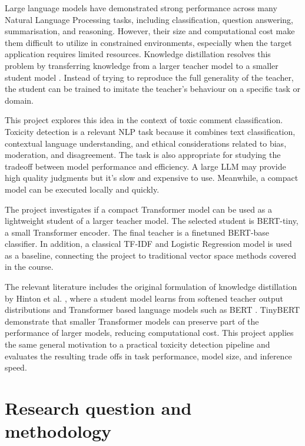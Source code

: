 \documentclass[pdflatex,sn-mathphys-num]{sn-jnl}
\begin{document}
Large language models have demonstrated strong performance across many Natural Language Processing tasks, including classification, question answering, summarisation, and reasoning.
However, their size and computational cost make them difficult to utilize in constrained environments, especially when the target application requires limited resources.
Knowledge distillation resolves this problem by transferring knowledge from a larger teacher model to a smaller student model \cite{hinton2015distilling}.
Instead of trying to reproduce the full generality of the teacher, the student can be trained to imitate the teacher's behaviour on a specific task or domain.

This project explores this idea in the context of toxic comment classification. Toxicity detection is a relevant NLP task because it combines text classification, contextual language understanding, and ethical considerations related to bias, moderation, and disagreement.
The task is also appropriate for studying the tradeoff between model performance and efficiency. A large LLM may provide high quality judgments but it's slow and expensive to use.
Meanwhile, a compact model can be executed locally and quickly.

The project investigates if a compact Transformer model can be used as a lightweight student of a larger teacher model.
The selected student is BERT-tiny, a small Transformer encoder.
The final teacher is a finetuned BERT-base classifier.
In addition, a classical TF-IDF and Logistic Regression model is used as a baseline, connecting the project to traditional vector space methods covered in the course.

The relevant literature includes the original formulation of knowledge distillation by Hinton et al. \cite{hinton2015distilling}, where a student model learns from softened teacher output distributions and Transformer based language models such as BERT \cite{devlin2019bert}.
TinyBERT \cite{jiao2020tinybert} demonstrate that smaller Transformer models can preserve part of the performance of larger models, reducing computational cost. 
This project applies the same general motivation to a practical toxicity detection pipeline and evaluates the resulting trade offs in task performance, model size, and inference speed.

\section{Research question and methodology}\label{sec:methodology}
\end{document}
